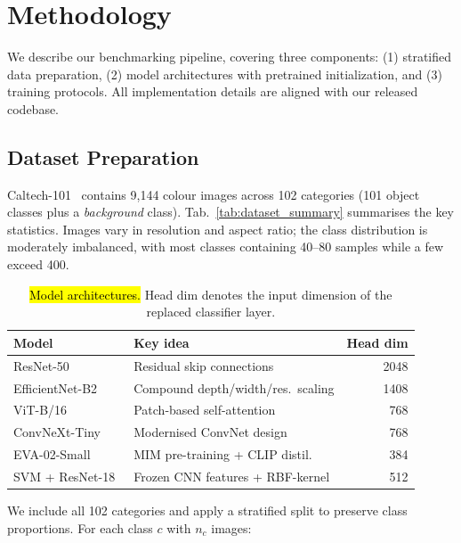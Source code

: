 \section{Methodology}

We describe our benchmarking pipeline, covering three components: (1) stratified data preparation, (2) model architectures with pretrained initialization, and (3) training protocols. All implementation details are aligned with our released codebase.

\subsection{Dataset Preparation}

Caltech-101~\citep{fei2004learning} contains 9{,}144 colour images across 102 categories (101 object classes plus a \textit{background} class). Tab.~\ref{tab:dataset_summary} summarises the key statistics. Images vary in resolution and aspect ratio; the class distribution is moderately imbalanced, with most classes containing 40--80 samples while a few exceed 400.

\begin{table}[h]
    \caption{\hl{Model architectures.} Head dim denotes the input dimension of the replaced classifier layer.}
    \label{tab:arch_summary}
    \setlength{\tabcolsep}{4pt}
    \small
    \begin{tabular}{l p{3.5cm} r}
    \toprule
    Model & Key idea & Head dim \\
    \midrule
    ResNet-50~\citep{he2016deep}          & Residual skip connections     & 2048 \\
    EfficientNet-B2~\citep{tan2019efficientnet} & Compound depth/width/res.\ scaling & 1408 \\
    ViT-B/16~\citep{dosovitskiy2020image}      & Patch-based self-attention    & 768  \\
    ConvNeXt-Tiny~\citep{liu2022convnet}   & Modernised ConvNet design     & 768  \\
    EVA-02-Small~\citep{fang2024eva}       & MIM pre-training + CLIP distil.\ & 384  \\
    \midrule
    SVM + ResNet-18~\citep{donahue2014decaf}   & Frozen CNN features + RBF-kernel & 512  \\
    \bottomrule
    \end{tabular}
    \end{table}

\noindent We include all 102 categories and apply a stratified split to preserve class proportions. For each class $c$ with $n_c$ images:


